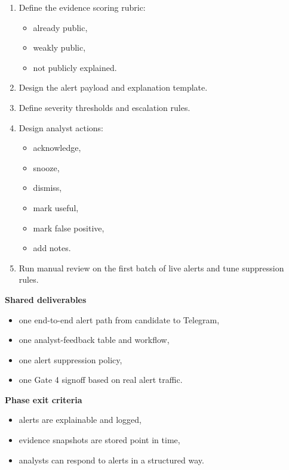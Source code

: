 \documentclass[
]{article}
\providecommand{\tightlist}{%
  \setlength{\itemsep}{0pt}\setlength{\parskip}{0pt}}
\begin{document}
\begin{enumerate}
\def\labelenumi{\arabic{enumi}.}
\tightlist
\item
  Define the evidence scoring rubric:

  \begin{itemize}
  \tightlist
  \item
    already public,
  \item
    weakly public,
  \item
    not publicly explained.
  \end{itemize}
\item
  Design the alert payload and explanation template.
\item
  Define severity thresholds and escalation rules.
\item
  Design analyst actions:

  \begin{itemize}
  \tightlist
  \item
    acknowledge,
  \item
    snooze,
  \item
    dismiss,
  \item
    mark useful,
  \item
    mark false positive,
  \item
    add notes.
  \end{itemize}
\item
  Run manual review on the first batch of live alerts and tune
  suppression rules.
\end{enumerate}

\textbf{Shared deliverables}

\begin{itemize}
\tightlist
\item
  one end-to-end alert path from candidate to Telegram,
\item
  one analyst-feedback table and workflow,
\item
  one alert suppression policy,
\item
  one Gate 4 signoff based on real alert traffic.
\end{itemize}

\textbf{Phase exit criteria}

\begin{itemize}
\tightlist
\item
  alerts are explainable and logged,
\item
  evidence snapshots are stored point in time,
\item
  analysts can respond to alerts in a structured way.
\end{itemize}
\end{document}
